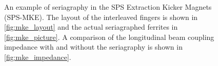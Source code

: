 \begin{figure}
\begin{center}
\end{center}
\caption{An example of seriagraphy in the SPS Extraction Kicker Magnets (SPS-MKE). The layout of the interleaved fingers is shown in \ref{fig:mke_layout} and the actual seriagraphed ferrites in \ref{fig:mke_picture}. A comparison of the longitudinal beam coupling impedance with and without the seriagraphy is shown in \ref{fig:mke_impedance}.}
\label{fig:mke_figures}
\end{figure}

